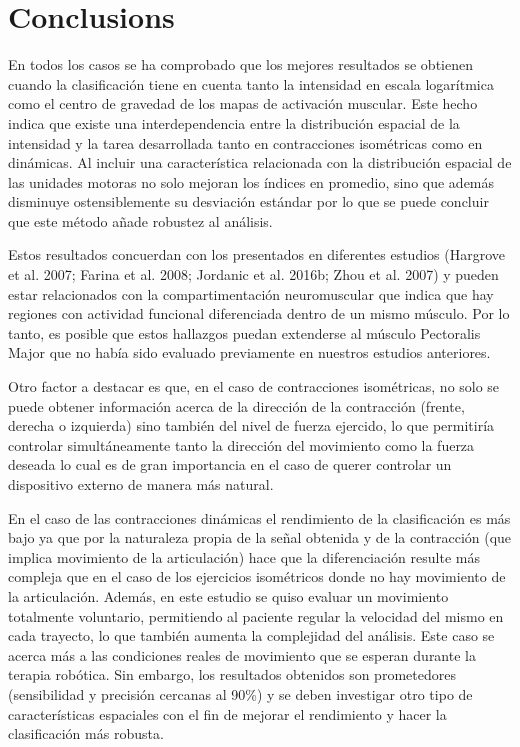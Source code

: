 \section{Conclusions}
En todos los casos se ha comprobado que los mejores resultados se obtienen cuando la clasificación tiene en cuenta tanto la intensidad en escala logarítmica como el centro de gravedad de los mapas de activación muscular. Este hecho indica que existe una interdependencia entre la distribución espacial de la intensidad y la tarea desarrollada tanto en contracciones isométricas como en dinámicas. Al incluir una característica relacionada con la distribución espacial de las unidades motoras no solo mejoran los índices en promedio, sino que además disminuye ostensiblemente su desviación estándar por lo que se puede concluir que este método añade robustez al análisis.

Estos resultados concuerdan con los presentados en diferentes estudios (Hargrove et al. 2007; Farina et al. 2008; Jordanic et al. 2016b; Zhou et al. 2007) y pueden estar relacionados con la compartimentación neuromuscular que indica que hay regiones con actividad funcional diferenciada dentro de un mismo músculo. Por lo tanto, es posible que estos hallazgos puedan extenderse al músculo Pectoralis Major que no había sido evaluado previamente en nuestros estudios anteriores.

Otro factor a destacar es que, en el caso de contracciones isométricas, no solo se puede obtener información acerca de la dirección de la contracción (frente, derecha o izquierda) sino también del nivel de fuerza ejercido, lo que permitiría controlar simultáneamente tanto la dirección del movimiento como la fuerza deseada lo cual es de gran importancia en el caso de querer controlar un dispositivo externo de manera más natural. 

En el caso de las contracciones dinámicas el rendimiento de la clasificación es más bajo ya que por la naturaleza propia de la señal obtenida y de la contracción (que implica movimiento de la articulación) hace que la diferenciación resulte más compleja que en el caso de los ejercicios isométricos donde no hay movimiento de la articulación. Además, en este estudio se quiso evaluar un movimiento totalmente voluntario, permitiendo al paciente regular la velocidad del mismo en cada trayecto, lo que también aumenta la complejidad del análisis. Este caso se acerca más a las condiciones reales de movimiento que se esperan durante la terapia robótica. Sin embargo, los resultados obtenidos son prometedores (sensibilidad y precisión cercanas al 90\%) y se deben investigar otro tipo de características espaciales con el fin de mejorar el rendimiento y hacer la clasificación más robusta.

